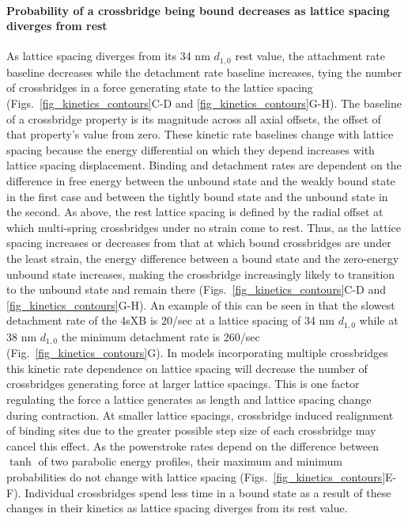 \documentclass[]{article}
\begin{document}
\paragraph{Probability of a crossbridge being bound decreases as lattice spacing diverges from rest} %
As lattice spacing diverges from its 34 nm $d_{1,0}$ rest value, the attachment rate baseline decreases while the detachment rate baseline increases, tying the number of crossbridges in a force generating state to the lattice spacing (Figs.~\ref{fig_kinetics_contours}C-D and \ref{fig_kinetics_contours}G-H). 
The baseline of a crossbridge property is its magnitude across all axial offsets, the offset of that property's value from zero. 
These kinetic rate baselines change with lattice spacing because the energy differential on which they depend increases with lattice spacing displacement.
Binding and detachment rates are dependent on the difference in free energy between the unbound state and the weakly bound state in the first case and between the tightly bound state and the unbound state in the second.
As above, the rest lattice spacing is defined by the radial offset at which multi-spring crossbridges under no strain come to rest. 
Thus, as the lattice spacing increases or decreases from that at which bound crossbridges are under the least strain, the energy difference between a bound state and the zero-energy unbound state increases, making the crossbridge increasingly likely to transition to the unbound state and remain there (Figs.~\ref{fig_kinetics_contours}C-D and  \ref{fig_kinetics_contours}G-H). 
An example of this can be seen in that the slowest detachment rate of the 4sXB is 20/sec at a lattice spacing of 34 nm $d_{1,0}$ while at 38 nm $d_{1,0}$ the minimum detachment rate is 260/sec (Fig.~\ref{fig_kinetics_contours}G).
In models incorporating multiple crossbridges this kinetic rate dependence on lattice spacing will decrease the number of crossbridges generating force at larger lattice spacings.
This is one factor regulating the force a lattice generates as length and lattice spacing change during contraction.
At smaller lattice spacings, crossbridge induced realignment of binding sites due to the greater possible step size of each crossbridge may cancel this effect.
As the powerstroke rates depend on the difference between $\tanh$ of two parabolic energy profiles, their maximum and minimum probabilities do not change with lattice spacing (Figs.~\ref{fig_kinetics_contours}E-F). 
Individual crossbridges spend less time in a bound state as a result of these changes in their kinetics as lattice spacing diverges from its rest value.
\end{document}
